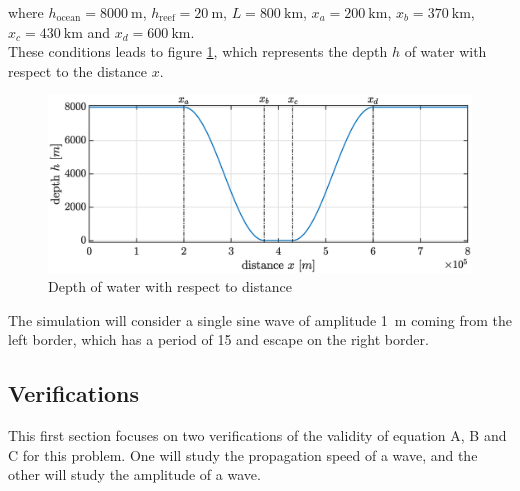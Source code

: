\documentclass[a4paper,12pt,twoside]{article}
\begin{document}
      where $h_\text{ocean} = \SI{8000}{\m}$, $h_\text{reef} = \SI{20}{\meter}$, $L=\SI{800}{\kilo\meter}$, $x_a = \SI{200}{\kilo\meter}$, $x_b = \SI{370}{\kilo\meter}$, $x_c=\SI{430}{\kilo\meter}$ and $x_d=\SI{600}{\kilo\meter}$.\\

      These conditions leads to figure \ref{fig:tsunami-depth}, which represents the depth $h$ of water with respect to the distance $x$.

      \begin{figure}[h]
        \centering
        \includegraphics[width=\textwidth]{graphs/tsunami_depth.eps}
        \caption{Depth of water with respect to distance}
        \label{fig:tsunami-depth}
      \end{figure}

      The simulation will consider a single sine wave of amplitude \SI{1}{\meter} coming from the left border, which has a period of \SI{15}{\min} and escape on the right border.\\

      \subsection{Verifications}
      This first section focuses on two verifications of the validity of equation A, B and C for this problem.
      One will study the propagation speed of a wave, and the other will study the amplitude of a wave.
\end{document}
